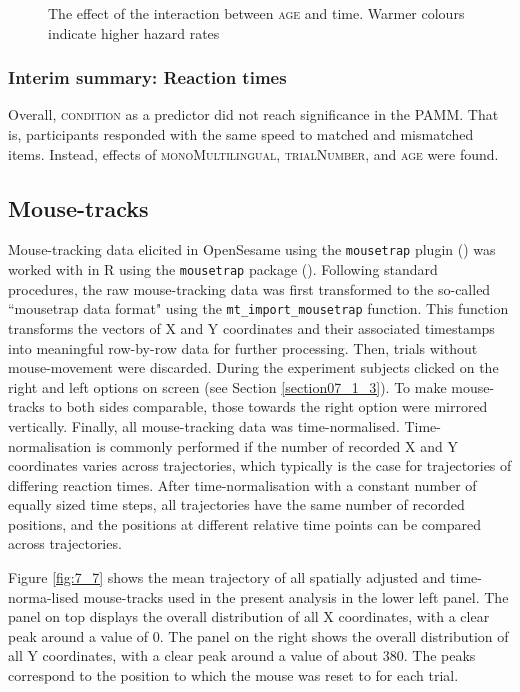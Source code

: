 \begin{figure}
    \centering
    
    \caption{The effect of the interaction between \textsc{age} and time. Warmer colours indicate higher hazard rates}
    \label{fig:7_6}
\end{figure}

\subsubsection{Interim summary: Reaction times}\label{section07_2_2_4}

Overall, \textsc{condition} as a predictor did not reach significance in the PAMM. That is, participants responded with the same speed to matched and mismatched items. Instead, effects of \textsc{monoMultilingual}, \textsc{trialNumber}, and \textsc{age} were found.

\subsection{Mouse-tracks}\label{section07_2_3}

Mouse-tracking data elicited in OpenSesame using the \texttt{mousetrap} plugin (\cite{Kieslich2017}) was worked with in R using the \texttt{mousetrap} package (\cite{Kieslich2019}). Following standard procedures, the raw mouse-tracking data was first transformed to the so-called ``mousetrap data format" using the \texttt{mt\_import\_mousetrap} function. This function transforms the vectors of X and Y coordinates and their associated timestamps into meaningful row-by-row data for further processing. Then, trials without mouse-movement were discarded. During the experiment subjects clicked on the right and left options on screen (see Section \ref{section07_1_3}). To make mouse-tracks to both sides comparable, those towards the right option were mirrored vertically. Finally, all mouse-tracking data was time-normalised. Time-normalisation is commonly performed if the number of recorded X and Y coordinates varies across trajectories, which typically is the case for trajectories of differing reaction times. After time-normalisation with a constant number of equally sized time steps, all trajectories have the same number of recorded positions, and the positions at different relative time points can be compared across trajectories. 

Figure \ref{fig:7_7} shows the mean trajectory of all spatially adjusted and time-norma-lised mouse-tracks used in the present analysis in the lower left panel. The panel on top displays the overall distribution of all X coordinates, with a clear peak around a value of $0$. The panel on the right shows the overall distribution of all Y coordinates, with a clear peak around a value of about $380$. The peaks correspond to the position to which the mouse was reset to for each trial.

